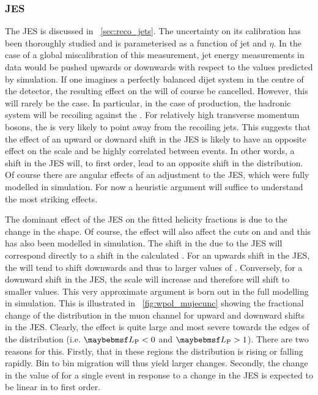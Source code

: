 \subsubsection{\acl{JES}}
\label{sec:wpol_syst_jec}
The \ac{JES} is discussed in \sec~\ref{sec:reco_jets}. The uncertainty on its
calibration has been thoroughly studied and is parameterised as a function of
jet \Pt and $\eta$. In the case of a global miscalibration of this measurement,
jet energy measurements in data would be pushed upwards or downwards with
respect to the values predicted by simulation. If one imagines a perfectly
balanced dijet system in the centre of the detector, the resulting effect on the
\METv will of course be cancelled. However, this will rarely be the case. In
particular, in the case of \Wjets production, the hadronic system will be
recoiling against the \PW. For relatively high transverse momentum \PW bosons,
the \METv is very likely to point away from the recoiling jets. This suggests
that the effect of an upward or downard shift in the \ac{JES} is likely to have
an opposite effect on the \METv scale and be highly correlated between
events. In other words, a shift in the \ac{JES} will, to first order,
lead to an opposite shift in the \MET distribution. Of course there are angular
effects of an adjustment to the \ac{JES}, which were fully modelled in
simulation. For now a heuristic argument will suffice to understand the most
striking effects.

The dominant effect of the \ac{JES} on the fitted helicity fractions is due to
the change in the \LP shape. Of course, the effect will also affect the cuts on
\PtW and \MT and this has also been modelled in simulation. The shift in the
\MET due to the \ac{JES} will correspond directly to a shift in the calculated
\LP. For an upwards shift in the \ac{JES}, the \MET will tend to shift downwards
and thus to larger values of \LP. Conversely, for a downward shift in the
\ac{JES}, the \MET scale will increase and therefore \LP will shift to smaller
values. This very approximate argument is born out in the full modelling in
simulation. This is illustrated in \fig~\ref{fig:wpol_mujecunc} showing the
fractional change of the \LP distribution in the muon channel for upward and
downward shifts in the \ac{JES}. Clearly, the effect is quite large and most
severe towards the edges of the \LP distribution (i.e. $\LP < 0$ and $\LP >
1$). There are two reasons for this. Firstly, that in these regions the \LP
distribution is rising or falling rapidly. Bin to bin migration will thus yield
larger changes. Secondly, the change in the value of \LP for a single event in
response to a change in the \ac{JES} is expected to be linear in \LP to first
order.

